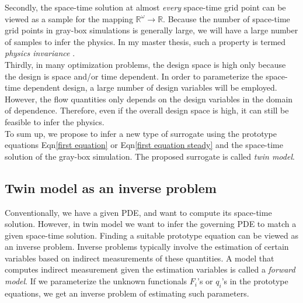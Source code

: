 \documentclass[a4paper,onecolumn]{article}
\theoremstyle{remark}
\begin{document}
\noindent Secondly, the space-time solution at almost \emph{every} space-time grid point can be viewed
as a sample for the mapping $\mathbb{R}^\omega \rightarrow \mathbb{R}$. 
Because the number of space-time grid points in gray-box simulations is generally large,
we will have a large number of samples to infer the physics. In my master thesis,
such a property is termed \emph{physics invariance} \cite{hanmaster}.\\

\noindent Thirdly, in many optimization problems, the design space is high only because
the design is space and/or time dependent. In order to parameterize the space-time dependent
design, a large number of design variables will be employed. However, 
the flow quantities only depends on the design variables in the domain of dependence.
Therefore, even if the overall design space is high, it can still be feasible to
infer the physics.\\

\noindent To sum up, we propose to infer a new type of surrogate using 
the prototype equations Eqn\eqref{first equation} or
Eqn\eqref{first equation steady} and the space-time solution of the gray-box simulation.
The proposed surrogate is called \emph{twin model}.



\subsection{Twin model as an inverse problem}
\label{inverse}
\noindent 
Conventionally, we have a given PDE, and want to compute
its space-time solution. However, in twin model we want to infer the governing PDE
to match a given space-time solution.
Finding a suitable prototype equation can be viewed
as an inverse problem. Inverse problems typically involve the estimation of certain variables
based on indirect measurements of these quantities. A model that computes indirect
measurement given the estimation variables is called a \emph{forward model}.
If we parameterize the unknown functionals $F_i$'s or $q_i$'s in the prototype equations,
we get an inverse problem of estimating such parameters.
\\
\end{document}
